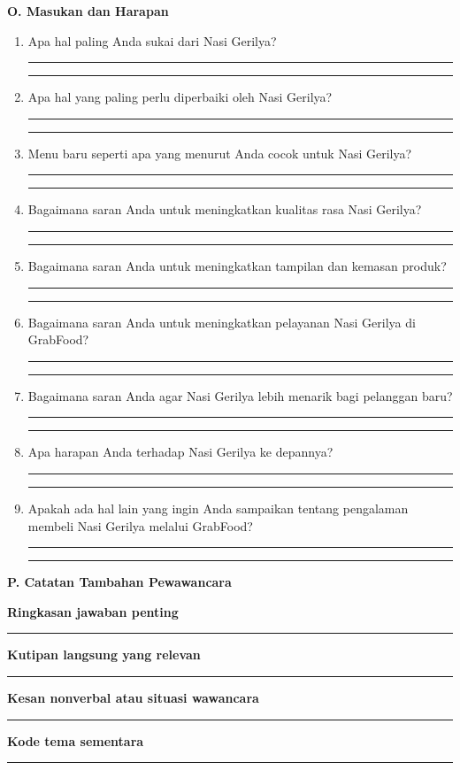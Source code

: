 \documentclass[11pt,a4paper]{article}
\newcommand{\sectionbar}[1]{%
  \Needspace{4\baselineskip}
  \vspace{5mm}
  \noindent\colorbox{Soft}{%
    \parbox{\dimexpr\linewidth-2\fboxsep\relax}{%
      \large\bfseries\textcolor{Primary}{#1}
    }%
  }\par\vspace{2mm}
}
\newcommand{\answerlines}{%
  \par\vspace{1.2mm}
  \noindent\textcolor{LineGray}{\rule{\linewidth}{0.35pt}}\par\vspace{4.8mm}
  \noindent\textcolor{LineGray}{\rule{\linewidth}{0.35pt}}\par\vspace{3.2mm}
}
\newcommand{\question}[1]{%
  \Needspace{6\baselineskip}
  \item #1
  \answerlines
}
\newcommand{\widefield}[1]{%
  \Needspace{4\baselineskip}
  \textbf{#1}\par
  \noindent\textcolor{LineGray}{\rule{\linewidth}{0.35pt}}\par\vspace{4mm}
}
\begin{document}
\sectionbar{O. Masukan dan Harapan}
\begin{enumerate}[label=\arabic*.,leftmargin=*,itemsep=2mm,resume]
\question{Apa hal paling Anda sukai dari Nasi Gerilya?}
\question{Apa hal yang paling perlu diperbaiki oleh Nasi Gerilya?}
\question{Menu baru seperti apa yang menurut Anda cocok untuk Nasi Gerilya?}
\question{Bagaimana saran Anda untuk meningkatkan kualitas rasa Nasi Gerilya?}
\question{Bagaimana saran Anda untuk meningkatkan tampilan dan kemasan produk?}
\question{Bagaimana saran Anda untuk meningkatkan pelayanan Nasi Gerilya di GrabFood?}
\question{Bagaimana saran Anda agar Nasi Gerilya lebih menarik bagi pelanggan baru?}
\question{Apa harapan Anda terhadap Nasi Gerilya ke depannya?}
\question{Apakah ada hal lain yang ingin Anda sampaikan tentang pengalaman membeli Nasi Gerilya melalui GrabFood?}
\end{enumerate}

\sectionbar{P. Catatan Tambahan Pewawancara}
\widefield{Ringkasan jawaban penting}
\widefield{Kutipan langsung yang relevan}
\widefield{Kesan nonverbal atau situasi wawancara}
\widefield{Kode tema sementara}
\end{document}
